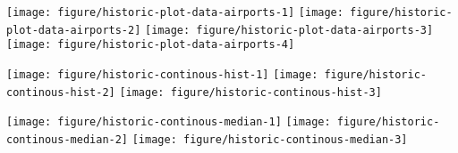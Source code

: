 \documentclass{article}\usepackage[]{graphicx}\usepackage[]{color}
\newenvironment{knitrout}{}{} %
\begin{document}
\begin{landscape}
\begin{knitrout}
\color{fgcolor}

{\centering \texttt{[image: figure/historic-plot-data-airports-1]} 
\texttt{[image: figure/historic-plot-data-airports-2]} 
\texttt{[image: figure/historic-plot-data-airports-3]} 
\texttt{[image: figure/historic-plot-data-airports-4]} 

}



\end{knitrout}
\vspace{3 mm}



\begin{knitrout}
\color{fgcolor}

{\centering \texttt{[image: figure/historic-continous-hist-1]} 
\texttt{[image: figure/historic-continous-hist-2]} 
\texttt{[image: figure/historic-continous-hist-3]} 

}



\end{knitrout}
\vspace{2 mm}

\begin{knitrout}
\color{fgcolor}

{\centering \texttt{[image: figure/historic-continous-median-1]} 
\texttt{[image: figure/historic-continous-median-2]} 
\texttt{[image: figure/historic-continous-median-3]} 

}



\end{knitrout}
\end{landscape}
\end{document}

